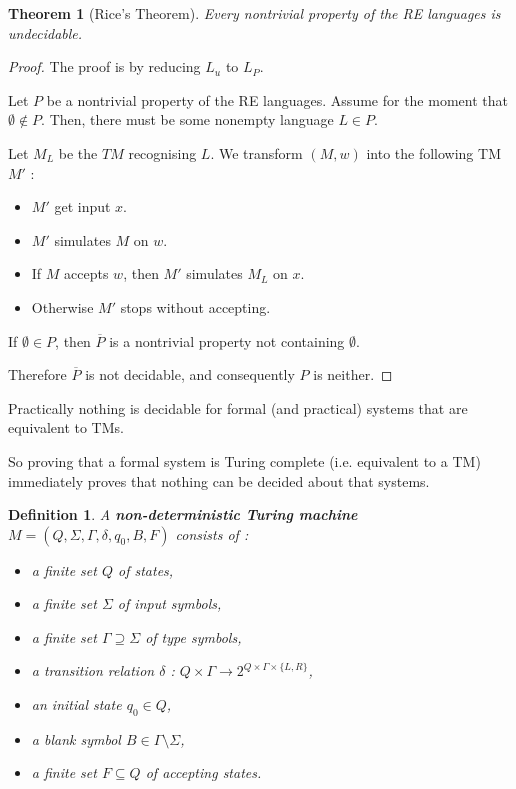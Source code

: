 \documentclass[a4paper,11pt]{report}
\newtheorem*{mydef}{Definition}
\newtheorem{theorem}{Theorem}
\begin{document}
\begin{theorem}[Rice's Theorem]
  Every nontrivial property of the RE languages is undecidable.
\end{theorem}

\begin{proof}
  The proof is by reducing $L_u$ to $L_P$.

  Let $P$ be a nontrivial property of the RE languages. Assume for the moment
  that $\emptyset \not \in P$. Then, there must be some nonempty language $L \in
  P$.

  Let $M_L$ be the $TM$ recognising $L$. We transform $(M,w)$ into the following
  TM $M'$ :
  \begin{itemize}
  \item $M'$ get input $x$.
  \item $M'$ simulates $M$ on $w$.
  \item If $M$ accepts $w$, then $M'$ simulates $M_L$ on $x$.
  \item Otherwise $M'$ stops without accepting.
  \end{itemize}

  If $\emptyset \in P$, then $\overline{P}$ is a nontrivial property not
  containing $\emptyset$.

  Therefore $\overline{P}$ is not decidable, and consequently $P$ is neither.
\end{proof}

Practically nothing is decidable for formal (and practical) systems that are
equivalent to TMs.

So proving that a formal system is Turing complete (i.e. equivalent to a TM)
immediately proves that nothing can be decided about that systems.

\begin{mydef}
  A \textbf{non-deterministic Turing machine} $M =
  (Q,\Sigma,\Gamma,\delta,q_0,B,F)$ consists of :
  \begin{itemize}
  \item a finite set $Q$ of states,
  \item a finite set $\Sigma$ of input symbols,
  \item a finite set $\Gamma \supseteq \Sigma$ of type symbols,
  \item a transition relation $\delta$ : $Q \times \Gamma \rightarrow
    2^{Q \times \Gamma \times \{L,R\}}$,
  \item an initial state $q_0 \in Q$,
  \item a blank symbol $B \in \Gamma \setminus \Sigma$,
  \item a finite set $F \subseteq Q$ of accepting states.
  \end{itemize}
\end{mydef}
\end{document}
